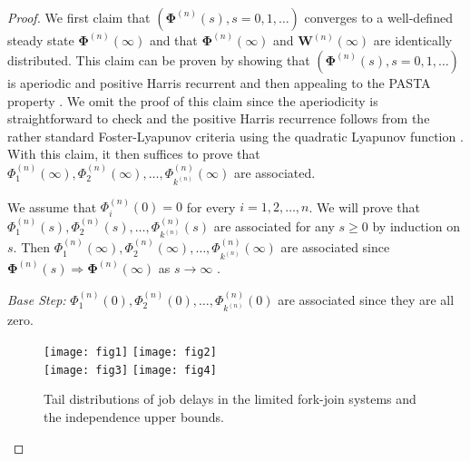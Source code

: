 \documentclass[sigconf]{acmart}
\newcommand{\supn}{^{(n)}}
\newcommand{\tod}{\Rightarrow}
\begin{document}
\begin{proof}
\begin{sloppypar}
We first claim that $(\bm{\Phi}\supn(s),s=0,1,\dots)$ converges to a well-defined steady state $\bm{\Phi}\supn(\infty)$ and that $\bm{\Phi}\supn(\infty)$ and $\bm{W}\supn(\infty)$ are identically distributed.  This claim can be proven by showing that $(\bm{\Phi}\supn(s),s=0,1,\dots)$ is aperiodic and positive Harris recurrent and then appealing to the PASTA property \cite{MelWhi_90}.  We omit the proof of this claim since the aperiodicity is straightforward to check and the positive Harris recurrence follows from the rather standard Foster-Lyapunov criteria using the quadratic Lyapunov function \cite{MeyTwe_92}.  With this claim, it then suffices to prove that $\Phi\supn_1(\infty),\allowbreak \Phi\supn_2(\infty),\dots,\allowbreak\Phi\supn_{k\supn}(\infty)$ are associated.

We assume that $\Phi\supn_i(0)=0$ for every $i=1,2,\dots,n$.  We will prove that $\Phi\supn_1(s),\Phi\supn_2(s),\dots,\Phi\supn_{k\supn}(s)$ are associated for any $s\ge 0$ by induction on $s$. Then $\Phi\supn_1(\infty),\allowbreak\Phi\supn_2(\infty),\dots,\allowbreak\Phi\supn_{k\supn}(\infty)$ are associated since $\bm{\Phi}\supn(s)\tod \bm{\Phi}\supn(\infty)$ as $s\to\infty$ \cite{EsaProWal_67}.
\end{sloppypar}

\emph{Base Step:} $\Phi\supn_1(0),\Phi\supn_2(0),\dots,\Phi\supn_{k\supn}(0)$ are associated since they are all zero.
\begin{figure*}
\centering
\texttt{[image: fig1]}
\quad
\texttt{[image: fig2]}
\\
\texttt{[image: fig3]}
\quad
\texttt{[image: fig4]}
\caption{Tail distributions of job delays in the limited fork-join systems and the independence upper bounds.}
\label{fig:ccdf}
\end{figure*}


\end{proof}
\end{document}
